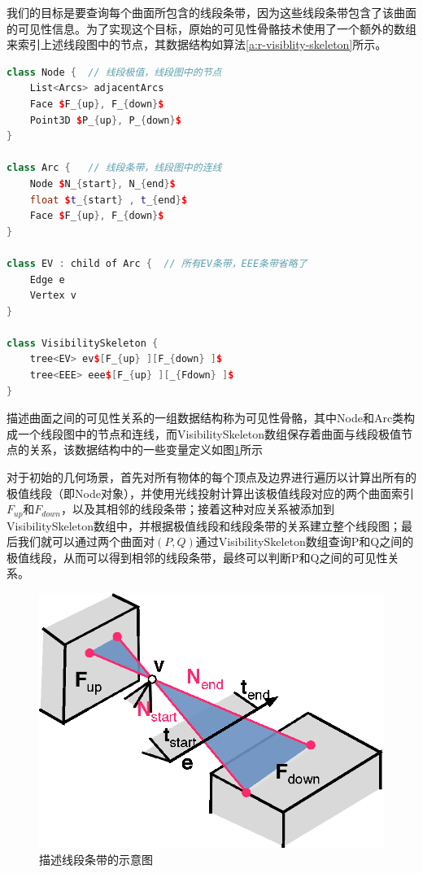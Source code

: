 我们的目标是要查询每个曲面所包含的线段条带，因为这些线段条带包含了该曲面的可见性信息。为了实现这个目标，原始的可见性骨骼技术\cite{a:TheVisibilitySkeleton:APowerfulAndEfficientMulti-PurposeGlobalVisibilityTool}使用了一个额外的数组来索引上述线段图中的节点，其数据结构如算法\ref{a:r-visiblity-skeleton}所示。

\begin{algorithm}
\begin{lstlisting}[language=C++, mathescape]
class Node {  // 线段极值，线段图中的节点
	List<Arcs> adjacentArcs 
	Face $F_{up}, F_{down}$ 
	Point3D $P_{up}, P_{down}$
}
	
class Arc {   // 线段条带，线段图中的连线
	Node $N_{start}, N_{end}$ 
	float $t_{start} , t_{end}$ 
	Face $F_{up}, F_{down}$
}
	
class EV : child of Arc {  // 所有EV条带，EEE条带省略了
	Edge e 
	Vertex v 
}
	
class VisibilitySkeleton { 
	tree<EV> ev$[F_{up} ][F_{down} ]$ 
	tree<EEE> eee$[F_{up} ][_{Fdown} ]$
}
\end{lstlisting}
\caption{描述曲面之间的可见性关系的一组数据结构称为可见性骨骼，其中Node和Arc类构成一个线段图中的节点和连线，而VisibilitySkeleton数组保存着曲面与线段极值节点的关系，该数据结构中的一些变量定义如图\ref{f:r-visibility-skeleton-structure-1}所示}
\label{a:r-visiblity-skeleton}
\end{algorithm}

对于初始的几何场景，首先对所有物体的每个顶点及边界进行遍历以计算出所有的极值线段（即Node对象），并使用光线投射计算出该极值线段对应的两个曲面索引$F_{up}$和$F_{down}$，以及其相邻的线段条带；接着这种对应关系被添加到VisibilitySkeleton数组中，并根据极值线段和线段条带的关系建立整个线段图；最后我们就可以通过两个曲面对$(P,Q)$通过VisibilitySkeleton数组查询P和Q之间的极值线段，从而可以得到相邻的线段条带，最终可以判断P和Q之间的可见性关系。

\begin{figure}
\sidecaption
	\includegraphics[width=.45\textwidth]{figures/r/visibility-skeleton-structure-1}
	\caption{描述线段条带的示意图}
	\label{f:r-visibility-skeleton-structure-1}
\end{figure}

